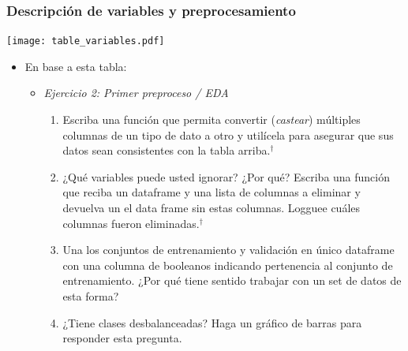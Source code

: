 \documentclass[leqno, 10pt, envcountsect]{beamer}
\numberwithin{equation}{section}
\theoremstyle{definition}
\theoremstyle{example}
\numberwithin{figure}{section}
\numberwithin{table}{section}
\let\olditem\item
\renewcommand{\item}{%
\olditem\vspace{1pt}}
\begin{document}
\begin{frame}[fragile=singleslide]
  \frametitle{Descripción de variables y preprocesamiento}
  \begin{center}
    \texttt{[image: table\_variables.pdf]}
  \end{center}
  \begin{itemize}
    \item En base a esta tabla:
      \begin{itemize}
        \item \textit{Ejercicio 2: Primer preproceso / EDA}
          \begin{enumerate}
            \item Escriba una función que permita convertir (\textit{castear})
              múltiples columnas de un tipo de dato a otro y utilícela para
              asegurar que sus datos sean consistentes con la tabla arriba.$^{\dag}$
            \item ¿Qué variables puede usted ignorar? ¿Por qué? Escriba una
              función que reciba un dataframe y una lista de columnas
              a eliminar y devuelva un el data frame sin estas columnas.
              Logguee cuáles columnas fueron eliminadas.$^{\dag}$
            \item Una los conjuntos de entrenamiento y validación en único
              dataframe con una columna de booleanos indicando pertenencia al
              conjunto de entrenamiento. ¿Por qué tiene sentido trabajar con un
              set de datos de esta forma?
            \item ¿Tiene clases desbalanceadas? Haga un gráfico de barras para
              responder esta pregunta.
          \end{enumerate}
      \end{itemize}
  \end{itemize}
\end{frame}
\end{document}
